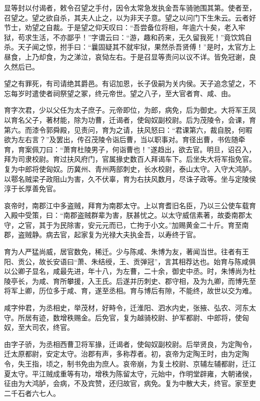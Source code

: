 \documentclass[]{article}
\begin{document}
显等封以付谒者，敕令召望之手付，因令太常急发执金吾车骑驰围其第。使者至，召望之。望之欲自杀，其夫人止之，以为非天子意。望之以问门下生朱云。云者好节士，劝望之自裁。于是望之仰天叹曰：``吾尝备位将相，年逾六十矣，老入牢狱，苟求生活，不亦鄙乎！''字谓云曰：``游，趣和药来，无久留我死！''竟饮鸩自杀。天子闻之惊，拊手曰：``曩固疑其不就牢狱，果然杀吾贤傅！''是时，太官方上昼食，上乃却食，为之涕泣，哀恸左右。于是召显等责问以议不详。皆免冠谢，良久然后已。

望之有罪死，有司请绝其爵邑。有诏加恩，长子伋嗣为关内侯。天子追念望之，不忘每岁时遣使者祠祭望之冢，终元帝世。望之八子，至大官者育、咸、由。

育字次君，少以父任为太子庶子。元帝即位，为郎，病免，后为御史。大将军王凤以育名父子，著材能，除为功曹，迁谒者，使匈奴副校尉。后为茂陵令，会课，育第六。而漆令郭舜殿，见责问，育为之请，扶风怒曰：``君课第六，裁自脱，何暇欲为左右言？''及罢出，传召茂陵令诣后曹，当以职事对。育径出曹，书佐随牵育，育案佩刀曰：``萧育杜陵男子，何诣曹也！''遂趋出，欲去官。明旦，诏召入，拜为司隶校尉。育过扶风府门，官属掾史数百人拜谒车下。后坐失大将军指免官。复为中郎将使匈奴。历冀州、青州两部刺史，长水校尉，泰山太守。入守大鸿胪。以鄠名贼梁子政阻山为害，久不伏辜，育为右扶风数月，尽诛子政等。坐与定陵侯淳于长厚善免官。

哀帝时，南郡江中多盗贼，拜育为南郡太守。上以育耆旧名臣，乃以三公使车载育入殿中受策，曰：``南郡盗贼群辈为害，朕甚忧之。以太守威信素著，故委南郡太守，之官，其于为民除害，安元元而已，亡拘于小文。''加赐黄金二十斤。育至南郡，盗贼静。病去官，起家复为光禄大夫执金吾，以寿终于官。

育为人严猛尚威，居官数免，稀迁。少与陈咸、朱博为友，著闻当世。往者有王阳、贡公，故长安语曰``萧、朱结绶，王、贡弹冠''，言其相荐达也。始育与陈咸俱以公卿子显名，咸最先进，年十八，为左曹，二十余，御史中丞。时，朱博尚为杜陵亭长，为咸、育所攀援，入王氏。后遂并历刺史、郡守相，及为九卿，而博先至将军上卿，历位多于咸、育，遂至丞相。育与博后有隙，不能终，故世以交为难。

咸字仲君，为丞相史，举茂材，好畤令，迁淮阳、泗水内史，张掖、弘农、河东太守。所居有迹，数增秩赐金。后免官，复为越骑校尉、护军都尉、中郎将，使匈奴，至大司农，终官。

由字子骄，为丞相西曹卫将军掾，迁谒者，使匈奴副校尉。后举贤良，为定陶令，迁太原都尉，安定太守。治郡有声，多称荐者。初，哀帝为定陶王时，由为定陶令，失王指，顷之，制书免由为庶人。哀帝崩，为复土校尉、京辅左辅都尉，迁江夏太守。平江贼成重等有功，增秩为陈留太守，元始中，作明堂辟雍，大朝诸侯，征由为大鸿胪，会病，不及宾赞，还归故官，病免。复为中散大夫，终官。家至吏二千石者六七人。
\end{document}
